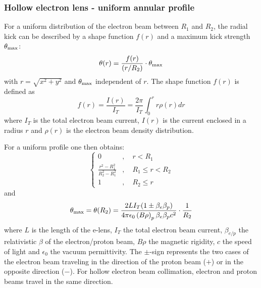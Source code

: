 \subsubsection{Hollow electron lens - uniform annular profile}
For a uniform distribution of the electron beam between $R_1$ and $R_2$, the radial kick can be described by a shape function $f(r)$ and a maximum kick strength $\theta_{\rm max}$:
\begin{equation}
\theta(r)=\frac{f(r)}{(r/R_2)}\cdot \theta_{\rm max}
\end{equation}
with $r=\sqrt{x^2+y^2}$ and $\theta_{\rm max}$ independent of $r$. The shape function $f(r)$ is defined as
\begin{equation}
f(r) = \frac{I(r)}{I_T}=\frac{2\pi}{I_T}\int_{0}^r r\rho(r) dr
\end{equation}
where $I_T$ is the total electron beam current, $I(r)$ is the current enclosed in a radius $r$ and $\rho(r)$ is the electron beam density distribution.

For a uniform profile one then obtains:
\begin{equation}
\begin{cases} 0 &,\quad r< R_1\\
\frac{r^2-R_1^2}{R_2^2-R_1^2} &,\quad R_1 \leq r < R_2\\
1 &,\quad R_2 \leq r
\end{cases}
\end{equation}
and
\begin{equation}
\theta_{\rm max} = \theta(R_2) = \frac{2LI_T(1\pm\beta_e\beta_p)}{4\pi\epsilon_0  \left(B\rho\right)_p\beta_e\beta_p c^2}\cdot\frac{1}{R_2}
\end{equation}
where $L$ is the length of the e-lens, $I_T$ the total electron beam current, $\beta_{e/p}$ the relativistic $\beta$ of the electron/proton beam, $B\rho$ the magnetic rigidity, $c$ the speed of light and $\epsilon_0$ the vacuum permittivity. The $\pm$-sign represents the two cases of the electron beam traveling in the direction of the proton beam ($+$) or in the opposite direction ($-$). For hollow electron beam collimation, electron and proton beams travel in the same direction.


